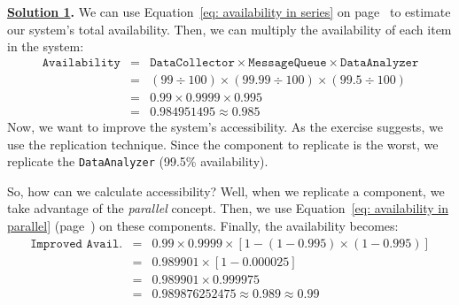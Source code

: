 \solution
\textbf{\underline{Solution 1}.} We can use Equation~\ref{eq: availability in series} on page~\pageref{eq: availability in series} to estimate our system's total availability. Then, we can multiply the availability of each item in the system:
\begin{equation*}
    \begin{array}{rcl}
        \texttt{Availability} &=& \texttt{DataCollector} \times \texttt{MessageQueue} \times \texttt{DataAnalyzer} \\ [.5em]
        &=& \left(99 \div 100\right) \times \left(99.99 \div 100\right) \times \left(99.5 \div 100\right) \\ [.5em]
        &=& 0.99 \times 0.9999 \times 0.995 \\ [.5em]
        &=& 0.984951495 \approx 0.985
    \end{array}
\end{equation*}
Now, we want to improve the system's accessibility. As the exercise suggests, we use the replication technique. Since the component to replicate is the worst, we replicate the \texttt{DataAnalyzer} (99.5\% availability).

So, how can we calculate accessibility? Well, when we replicate a component, we take advantage of the \emph{parallel} concept. Then, we use Equation~\ref{eq: availability in parallel} (page~\pageref{eq: availability in parallel}) on these components. Finally, the availability becomes:
\begin{equation*}
    \begin{array}{rcl}
        \texttt{Improved Avail.} &=& 0.99 \times 0.9999 \times \left[1 - \left(1 - 0.995\right)\times\left(1 - 0.995\right)\right] \\ [.5em]
        &=& 0.989901 \times \left[1 - 0.000025\right] \\ [.5em]
        &=& 0.989901 \times 0.999975 \\ [.5em]
        &=& 0.989876252475 \approx 0.989 \approx 0.99
    \end{array}
\end{equation*}

